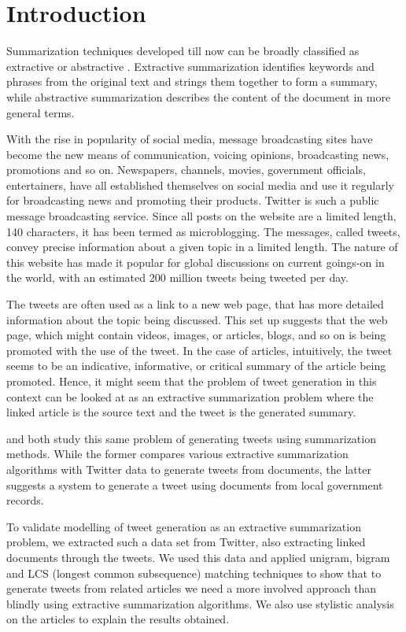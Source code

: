 \section{Introduction}
Summarization techniques developed till now can be broadly classified as extractive or abstractive \cite{hahn2000challenges}. Extractive summarization identifies keywords and phrases from the original text and strings them together to form a summary, while abstractive summarization describes the content of the document in more general terms.

With the rise in popularity of social media, message broadcasting sites have become the new means of communication, voicing opinions, broadcasting news, promotions and so on. Newspapers, channels, movies, government officials, entertainers, have all established themselves on social media and use it regularly for broadcasting news and promoting their products. Twitter is such a public message broadcasting service. Since all posts on the website are a limited length, 140 characters, it has been termed as microblogging. The messages, called tweets, convey precise information about a given topic in a limited length. The nature of this website has made it popular for global discussions on current goings-on in the world, with an estimated 200 million tweets being tweeted per day.

The tweets are often used as a link to a new web page, that has more detailed information about the topic being discussed. This set up suggests that the web page, which might contain videos, images, or articles, blogs, and so on is being promoted with the use of the tweet. In the case of articles, intuitively, the tweet seems to be an indicative, informative, or critical summary of the article being promoted. Hence, it might seem that the problem of tweet generation in this context can be looked at as an extractive summarization problem where the linked article is the source text and the tweet is the generated summary. 

 and  both study this same problem of generating tweets using summarization methods. While the former compares various extractive summarization algorithms with Twitter data to generate tweets from documents, the latter suggests a system to generate a tweet using documents from local government records. 

To validate modelling of tweet generation as an extractive summarization problem, we extracted such a data set from Twitter, also extracting linked documents through the tweets. We used this data and applied unigram, bigram and LCS (longest common subsequence) matching techniques to show that to generate tweets from related articles we need a more involved approach than blindly using extractive summarization algorithms. We also use stylistic analysis on the articles to explain the results obtained.